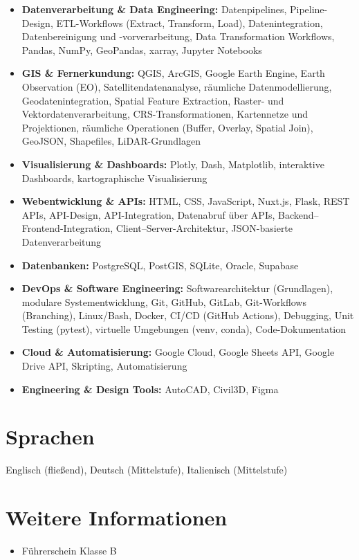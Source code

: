 \documentclass[a4paper,10pt]{article}
\begin{document}
\begin{itemize}[leftmargin=*, itemsep=0.3em]
    \item \textbf{Datenverarbeitung \& Data Engineering:} Datenpipelines, Pipeline-Design, ETL-Workflows (Extract, Transform, Load), Datenintegration, Datenbereinigung und -vorverarbeitung, Data Transformation Workflows, Pandas, NumPy, GeoPandas, xarray, Jupyter Notebooks

    \item \textbf{GIS \& Fernerkundung:} QGIS, ArcGIS, Google Earth Engine, Earth Observation (EO), Satellitendatenanalyse, räumliche Datenmodellierung, Geodatenintegration, Spatial Feature Extraction, Raster- und Vektordatenverarbeitung, CRS-Transformationen, Kartennetze und Projektionen, räumliche Operationen (Buffer, Overlay, Spatial Join), GeoJSON, Shapefiles, LiDAR-Grundlagen

    \item \textbf{Visualisierung \& Dashboards:} Plotly, Dash, Matplotlib, interaktive Dashboards, kartographische Visualisierung

    \item \textbf{Webentwicklung \& APIs:} HTML, CSS, JavaScript, Nuxt.js, Flask, REST APIs, API-Design, API-Integration, Datenabruf über APIs, Backend--Frontend-Integration, Client--Server-Architektur, JSON-basierte Datenverarbeitung

    \item \textbf{Datenbanken:} PostgreSQL, PostGIS, SQLite, Oracle, Supabase

    \item \textbf{DevOps \& Software Engineering:} Softwarearchitektur (Grundlagen), modulare Systementwicklung, Git, GitHub, GitLab, Git-Workflows (Branching), Linux/Bash, Docker, CI/CD (GitHub Actions), Debugging, Unit Testing (pytest), virtuelle Umgebungen (venv, conda), Code-Dokumentation

    \item \textbf{Cloud \& Automatisierung:} Google Cloud, Google Sheets API, Google Drive API, Skripting, Automatisierung

    \item \textbf{Engineering \& Design Tools:} AutoCAD, Civil3D, Figma

\end{itemize}
\section*{Sprachen}

Englisch (fließend), Deutsch (Mittelstufe), Italienisch (Mittelstufe)

\section*{Weitere Informationen}

\begin{itemize}[leftmargin=*, itemsep=0.25em]
    \item Führerschein Klasse B
\end{itemize}
\end{document}
